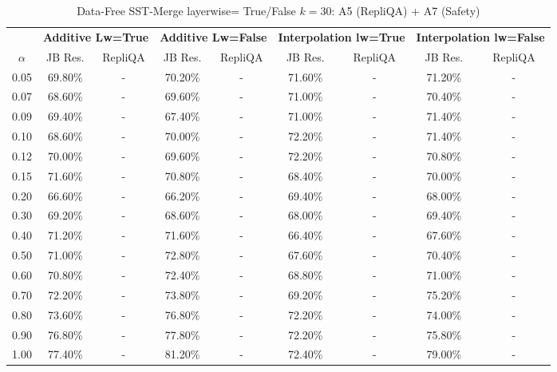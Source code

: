 \begin{table}[h]
\centering
\caption{Data-Free SST-Merge layerwise= True/False $k=30$: A5 (RepliQA) + A7 (Safety)}
\label{tab:res_a5_a7_data_free_sst_30}
\begin{tabular}{c|cc|cc|cc|cc}
\hline
 & \multicolumn{2}{c|}{\textbf{Additive Lw=True}} & \multicolumn{2}{c|}{\textbf{Additive Lw=False}} & \multicolumn{2}{c|}{\textbf{Interpolation lw=True}}& \multicolumn{2}{c}{\textbf{Interpolation lw=False}} \\
$\alpha$ & JB Res. & RepliQA & JB Res. & RepliQA & JB Res. & RepliQA & JB Res. & RepliQA \\
\hline
0.05 & 69.80\% & - & 70.20\% & - & 71.60\% & - & 71.20\% & - \\
0.07 & 68.60\% & - & 69.60\% & - & 71.00\% & - & 70.40\% & - \\
0.09 & 69.40\% & - & 67.40\% & - & 71.00\% & - & 71.40\% & - \\
0.10 & 68.60\% & - & 70.00\% & - & 72.20\% & - & 71.40\% & - \\
0.12 & 70.00\% & - & 69.60\% & - & 72.20\% & - & 70.80\% & - \\
0.15 & 71.60\% & - & 70.80\% & - & 68.40\% & - & 70.00\% & - \\
0.20 & 66.60\% & - & 66.20\% & - & 69.40\% & - & 68.00\% & - \\
0.30 & 69.20\% & - & 68.60\% & - & 68.00\% & - & 69.40\% & - \\
0.40 & 71.20\% & - & 71.60\% & - & 66.40\% & - & 67.60\% & - \\
0.50 & 71.00\% & - & 72.80\% & - & 67.60\% & - & 70.40\% & - \\
0.60 & 70.80\% & - & 72.40\% & - & 68.80\% & - & 71.00\% & - \\
0.70 & 72.20\% & - & 73.80\% & - & 69.20\% & - & 75.20\% & - \\
0.80 & 73.60\% & - & 76.80\% & - & 72.20\% & - & 74.00\% & - \\
0.90 & 76.80\% & - & 77.80\% & - & 72.20\% & - & 75.80\% & - \\
1.00 & 77.40\% & - & 81.20\% & - & 72.40\% & - & 79.00\% & - \\
\hline
\end{tabular}
\end{table}
\FloatBarrier

